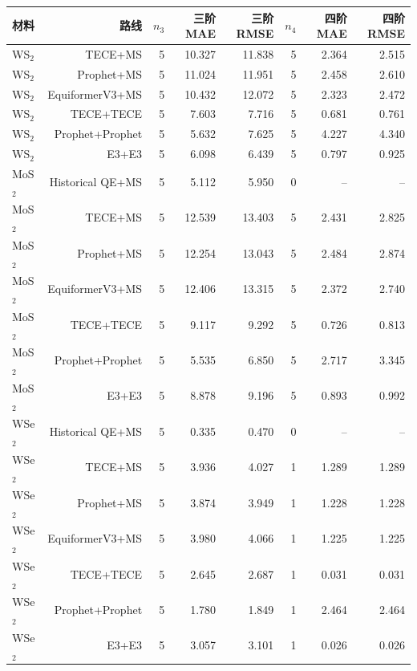 \begin{tabular}{lrrrrrrr}
\toprule
材料 & 路线 & $n_3$ & 三阶 MAE & 三阶 RMSE & $n_4$ & 四阶 MAE & 四阶 RMSE \\
\midrule
WS$_2$ & TECE+MS & 5 & 10.327 & 11.838 & 5 & 2.364 & 2.515 \\
WS$_2$ & Prophet+MS & 5 & 11.024 & 11.951 & 5 & 2.458 & 2.610 \\
WS$_2$ & EquiformerV3+MS & 5 & 10.432 & 12.072 & 5 & 2.323 & 2.472 \\
WS$_2$ & TECE+TECE & 5 & 7.603 & 7.716 & 5 & 0.681 & 0.761 \\
WS$_2$ & Prophet+Prophet & 5 & 5.632 & 7.625 & 5 & 4.227 & 4.340 \\
WS$_2$ & E3+E3 & 5 & 6.098 & 6.439 & 5 & 0.797 & 0.925 \\
MoS$_2$ & Historical QE+MS & 5 & 5.112 & 5.950 & 0 & -- & -- \\
MoS$_2$ & TECE+MS & 5 & 12.539 & 13.403 & 5 & 2.431 & 2.825 \\
MoS$_2$ & Prophet+MS & 5 & 12.254 & 13.043 & 5 & 2.484 & 2.874 \\
MoS$_2$ & EquiformerV3+MS & 5 & 12.406 & 13.315 & 5 & 2.372 & 2.740 \\
MoS$_2$ & TECE+TECE & 5 & 9.117 & 9.292 & 5 & 0.726 & 0.813 \\
MoS$_2$ & Prophet+Prophet & 5 & 5.535 & 6.850 & 5 & 2.717 & 3.345 \\
MoS$_2$ & E3+E3 & 5 & 8.878 & 9.196 & 5 & 0.893 & 0.992 \\
WSe$_2$ & Historical QE+MS & 5 & 0.335 & 0.470 & 0 & -- & -- \\
WSe$_2$ & TECE+MS & 5 & 3.936 & 4.027 & 1 & 1.289 & 1.289 \\
WSe$_2$ & Prophet+MS & 5 & 3.874 & 3.949 & 1 & 1.228 & 1.228 \\
WSe$_2$ & EquiformerV3+MS & 5 & 3.980 & 4.066 & 1 & 1.225 & 1.225 \\
WSe$_2$ & TECE+TECE & 5 & 2.645 & 2.687 & 1 & 0.031 & 0.031 \\
WSe$_2$ & Prophet+Prophet & 5 & 1.780 & 1.849 & 1 & 2.464 & 2.464 \\
WSe$_2$ & E3+E3 & 5 & 3.057 & 3.101 & 1 & 0.026 & 0.026 \\
\bottomrule
\end{tabular}
